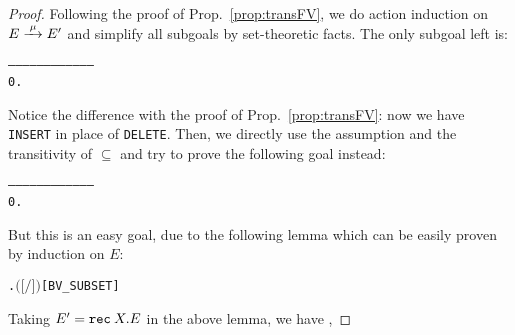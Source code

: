 \begin{proof}
Following the proof of Prop.~\ref{prop:transFV}, we do action
induction on $E \arr{\mu} E'$ and simplify all subgoals by set-theoretic
facts. The only subgoal left is:
\begin{alltt}
   ------------------------------------
    0.  
\end{alltt}
Notice the difference with the proof of Prop.~\ref{prop:transFV}: now
we have \texttt{INSERT} in place of \texttt{DELETE}. Then, we directly
use the assumption and the transitivity of $\subseteq$ and try to
prove the following goal instead:
\begin{alltt}
   ------------------------------------
    0.  
\end{alltt}
But this is an easy goal, due to the following lemma which can be
easily proven by induction on $E$:
\begin{alltt}
\HOLTokenTurnstile{} \HOLSymConst{\HOLTokenForall{}}  .  \ensuremath{(}\ensuremath{[}\ensuremath{/}\ensuremath{]} \ensuremath{)} \HOLSymConst{\HOLTokenSubset{}}   \HOLSymConst{\HOLTokenUnion{}}  \hfill{[BV_SUBSET]}
\end{alltt}
Taking $E ' = {\tt rec}\: X . E$ in the above lemma, we have
    ,

\end{proof}
